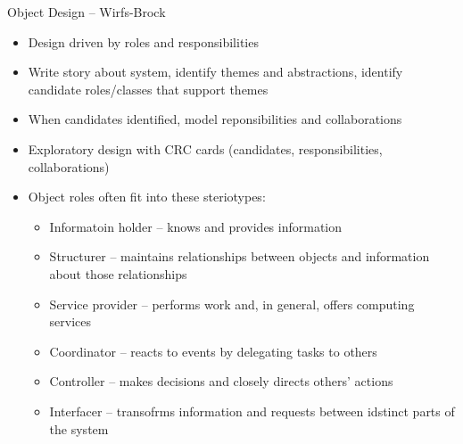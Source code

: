 \documentclass{beamer}
\begin{document}
\begin{frame}[fragile]{Object Design -- Wirfs-Brock}


\begin{itemize}
\item Design driven by roles and responsibilities
\item Write story about system, identify themes and abstractions, identify candidate roles/classes that support themes
\item When candidates identified, model reponsibilities and collaborations
\item Exploratory design with CRC cards (candidates, responsibilities, collaborations)
\item Object roles often fit into these steriotypes:
  \begin{itemize}
  \item Informatoin holder -- knows and provides information
  \item Structurer -- maintains relationships between objects and information about those relationships
  \item Service provider -- performs work and, in general, offers computing services
  \item Coordinator -- reacts to events by delegating tasks to others
  \item Controller -- makes decisions and closely directs others' actions
  \item Interfacer -- transofrms information and requests between idstinct parts of the system
  \end{itemize}
\end{itemize}


\end{frame}
\end{document}
